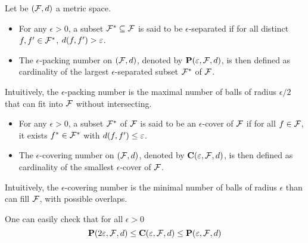 \begin{tcolorbox}
    \begin{definition}
        Let be $(\mathcal{F}, d)$ a metric space. 
        \begin{itemize}
            \item For any $\epsilon> 0$, a subset $\mathcal{F}^* \subseteq \mathcal{F}$ is said to be $\epsilon$-separated if for all distinct $f, f' \in \mathcal{F}^*$, $d(f, f') > \varepsilon$.
            \item The $\epsilon$-packing number on $(\mathcal{F}, d)$, denoted by $\mathbf{P}(\varepsilon, \mathcal{F}, d)$, is then defined as cardinality of the largest $\epsilon$-separated subset $\mathcal{F}^*$ of $\mathcal{F}$.
        \end{itemize}
        Intuitively, the $\epsilon$-packing number is the maximal number of balls of radius $\epsilon/2$ that can fit into $\mathcal{F}$ without intersecting.
        \begin{itemize}
            \item For any $\epsilon> 0$, a subset $\mathcal{F}^*$ of $\mathcal{F}$ is said to be an $\epsilon$-cover of $\mathcal{F}$ if for all $f \in \mathcal{F}$, it exists $f^* \in \mathcal{F}^*$ with $d(f, f') \leq \varepsilon$.
            \item The $\epsilon$-covering number on $(\mathcal{F}, d)$, denoted by $\mathbf{C}(\varepsilon, \mathcal{F}, d)$, is then defined as cardinality of the smallest $\epsilon$-cover of $\mathcal{F}$.
        \end{itemize}
        Intuitively, the $\epsilon$-covering number is the minimal number of balls of radius $\epsilon$ than can fill $\mathcal{F}$, with possible overlaps.
    \end{definition}

    One can easily check that for all $\epsilon>0$
    \begin{equation}
        \mathbf{P}(2\varepsilon, \mathcal{F}, d) \leq \mathbf{C}(\varepsilon, \mathcal{F}, d) \leq \mathbf{P}(\varepsilon, \mathcal{F}, d)
    \end{equation}
\end{tcolorbox}





